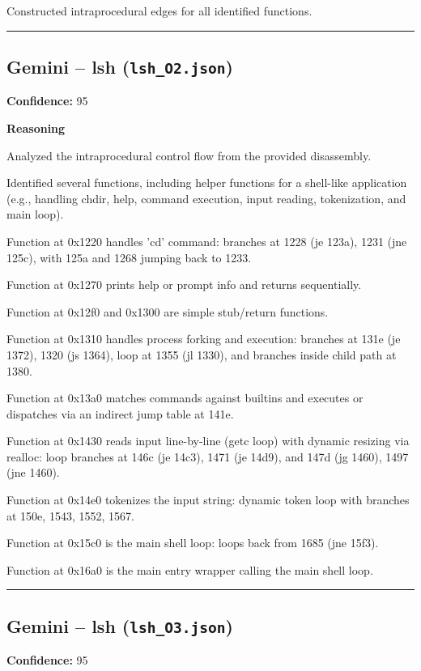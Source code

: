 Constructed intraprocedural edges for all identified functions.

\bigskip
\hrule
\bigskip

\subsection{Gemini -- lsh (\texttt{lsh\_O2.json})}

\textbf{Confidence:} 95

\textbf{Reasoning}

Analyzed the intraprocedural control flow from the provided disassembly.

Identified several functions, including helper functions for a shell-like application (e.g., handling chdir, help, command execution, input reading, tokenization, and main loop).

Function at 0x1220 handles 'cd' command: branches at 1228 (je 123a), 1231 (jne 125c), with 125a and 1268 jumping back to 1233.

Function at 0x1270 prints help or prompt info and returns sequentially.

Function at 0x12f0 and 0x1300 are simple stub/return functions.

Function at 0x1310 handles process forking and execution: branches at 131e (je 1372), 1320 (js 1364), loop at 1355 (jl 1330), and branches inside child path at 1380.

Function at 0x13a0 matches commands against builtins and executes or dispatches via an indirect jump table at 141e.

Function at 0x1430 reads input line-by-line (getc loop) with dynamic resizing via realloc: loop branches at 146c (je 14c3), 1471 (je 14d9), and 147d (jg 1460), 1497 (jne 1460).

Function at 0x14e0 tokenizes the input string: dynamic token loop with branches at 150e, 1543, 1552, 1567.

Function at 0x15c0 is the main shell loop: loops back from 1685 (jne 15f3).

Function at 0x16a0 is the main entry wrapper calling the main shell loop.

\bigskip
\hrule
\bigskip

\subsection{Gemini -- lsh (\texttt{lsh\_O3.json})}

\textbf{Confidence:} 95

